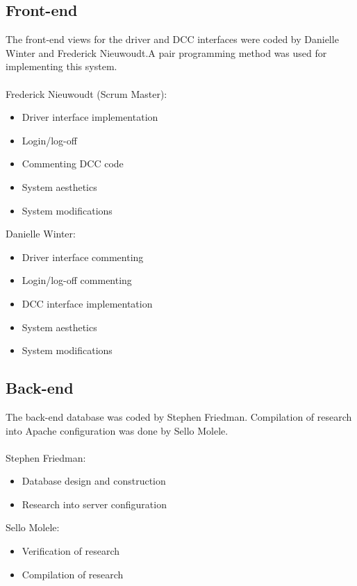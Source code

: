 \documentclass[10pt,twocolumn]{witseiepaper}
\begin{document}
\subsection{Front-end}
The front-end views for the driver and DCC interfaces were coded by Danielle Winter and Frederick Nieuwoudt.A pair programming method was used for implementing this system.\\ \\
Frederick Nieuwoudt (Scrum Master):
\begin{itemize}
\item Driver interface implementation
\item Login/log-off 
\item Commenting DCC code
\item System aesthetics
\item System modifications
\end{itemize}
Danielle Winter:
\begin{itemize}
\item Driver interface commenting
\item Login/log-off commenting
\item DCC interface implementation
\item System aesthetics
\item System modifications
\end{itemize}

\subsection{Back-end}
The back-end database was coded by Stephen Friedman. Compilation of research into Apache configuration was done by Sello Molele.
\\ \\
Stephen Friedman:
\begin{itemize}
\item Database design and construction
\item Research into server configuration
\end{itemize}
Sello Molele:
\begin{itemize}
\item Verification of research
\item Compilation of research
\end{itemize}

\pagebreak
\end{document}
